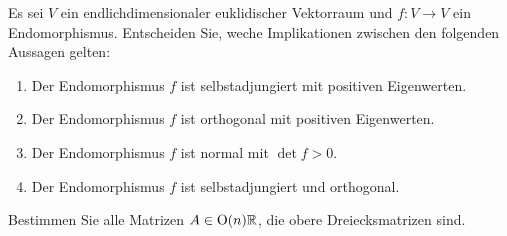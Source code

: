 \documentclass[a4paper, 10pt]{scrartcl}
\begin{document}
\begin{question}
  Es sei $V$ ein endlichdimensionaler euklidischer Vektorraum und $f \colon V \to V$ ein Endomorphismus.
  Entscheiden Sie, weche Implikationen zwischen den folgenden Aussagen gelten:
  \begin{enumerate}
    \item
      Der Endomorphismus $f$ ist selbstadjungiert mit positiven Eigenwerten.
    \item
      Der Endomorphismus $f$ ist orthogonal mit positiven Eigenwerten.
    \item
      Der Endomorphismus $f$ ist normal mit $\det f > 0$.
    \item
      Der Endomorphismus $f$ ist selbstadjungiert und orthogonal.
  \end{enumerate}
\end{question}





\begin{question}
  Bestimmen Sie alle Matrizen $A \in \operatorname{O}(n){\mathbb{R}}$, die obere Dreiecksmatrizen sind.
\end{question}
\end{document}
